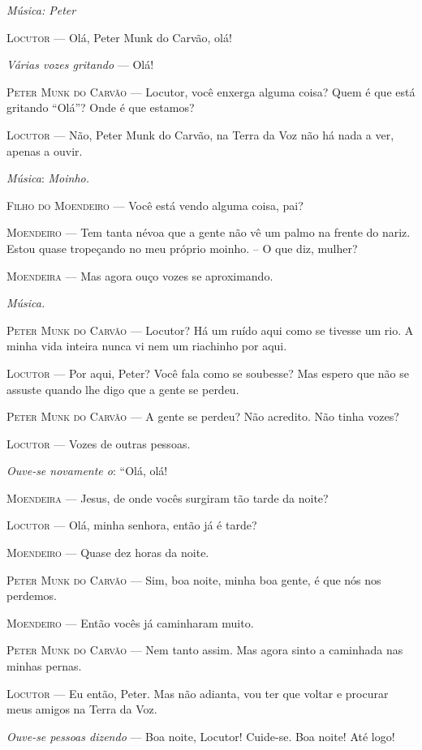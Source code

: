 \emph{Música: Peter}

\textsc{Locutor} --- Olá, Peter Munk do Carvão, olá!

\emph{Várias vozes gritando} --- Olá!

\textsc{Peter Munk do Carvão} --- Locutor, você enxerga alguma coisa? Quem é que
está gritando ``Olá''? Onde é que estamos?

\textsc{Locutor} --- Não, Peter Munk do Carvão, na Terra da Voz não há nada a ver,
apenas a ouvir.

\emph{Música}: \emph{Moinho.}

\textsc{Filho do Moendeiro} --- Você está vendo alguma coisa, pai?

\textsc{Moendeiro} --- Tem tanta névoa que a gente não vê um palmo na frente do
nariz. Estou quase tropeçando no meu próprio moinho. -- O que diz,
mulher?

\textsc{Moendeira} --- Mas agora ouço vozes se aproximando.

\emph{Música.}

\textsc{Peter Munk do Carvão} --- Locutor? Há um ruído aqui como se tivesse um
rio. A minha vida inteira nunca vi nem um riachinho por aqui.

\textsc{Locutor} --- Por aqui, Peter? Você fala como se soubesse? Mas espero que
não se assuste quando lhe digo que a gente se perdeu.

\textsc{Peter Munk do Carvão} --- A gente se perdeu? Não acredito. Não tinha
vozes?

\textsc{Locutor} --- Vozes de outras pessoas.

\emph{Ouve-se novamente o}: ``Olá, olá!

\textsc{Moendeira} --- Jesus, de onde vocês surgiram tão tarde da noite?

\textsc{Locutor} --- Olá, minha senhora, então já é tarde?

\textsc{Moendeiro} --- Quase dez horas da noite.

\textsc{Peter Munk do Carvão} --- Sim, boa noite, minha boa gente, é que nós nos
perdemos.

\textsc{Moendeiro} --- Então vocês já caminharam muito.

\textsc{Peter Munk do Carvão} --- Nem tanto assim. Mas agora sinto a caminhada nas
minhas pernas.

\textsc{Locutor} --- Eu então, Peter. Mas não adianta, vou ter que voltar e
procurar meus amigos na Terra da Voz.

\emph{Ouve-se pessoas dizendo} --- Boa noite, Locutor! Cuide-se. Boa
noite! Até logo!

